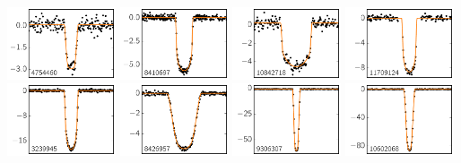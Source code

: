 \includegraphics[width=0.24\textwidth]{figures/lcs/4754460.pdf}
\includegraphics[width=0.24\textwidth]{figures/lcs/8410697.pdf}
\includegraphics[width=0.24\textwidth]{figures/lcs/10842718.pdf}
\includegraphics[width=0.24\textwidth]{figures/lcs/11709124.pdf}
\includegraphics[width=0.24\textwidth]{figures/lcs/3239945.pdf}
\includegraphics[width=0.24\textwidth]{figures/lcs/8426957.pdf}
\includegraphics[width=0.24\textwidth]{figures/lcs/9306307.pdf}
\includegraphics[width=0.24\textwidth]{figures/lcs/10602068.pdf}
